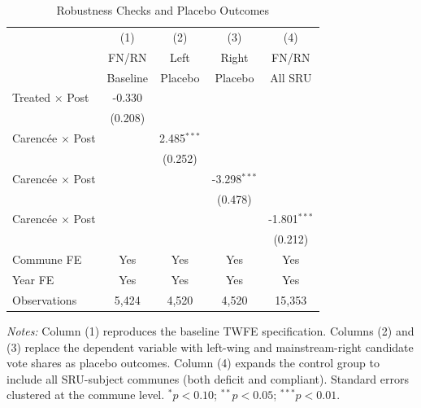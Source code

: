 \begin{table}[t]
\centering
\caption{Robustness Checks and Placebo Outcomes}
\label{tab:robustness}
\small
\begin{tabular}{lcccc}
\toprule
 & (1) & (2) & (3) & (4) \\
 & FN/RN & Left & Right & FN/RN \\
 & Baseline & Placebo & Placebo & All SRU \\
\midrule
Treated $\times$ Post & -0.330 & & & \\
 & (0.208) & & & \\
Carenc\'{e}e $\times$ Post & & 2.485$^{***}$ & & \\
 & & (0.252) & & \\
Carenc\'{e}e $\times$ Post & & & -3.298$^{***}$ & \\
 & & & (0.478) & \\
Carenc\'{e}e $\times$ Post & & & & -1.801$^{***}$ \\
 & & & & (0.212) \\
\midrule
Commune FE & Yes & Yes & Yes & Yes \\
Year FE & Yes & Yes & Yes & Yes \\
Observations & 5,424 & 4,520 & 4,520 & 15,353 \\
\bottomrule
\end{tabular}
\begin{tablenotes}
\item \textit{Notes:} Column (1) reproduces the baseline TWFE specification. Columns (2) and (3) replace the dependent variable with left-wing and mainstream-right candidate vote shares as placebo outcomes. Column (4) expands the control group to include all SRU-subject communes (both deficit and compliant). Standard errors clustered at the commune level. $^{*}p<0.10$; $^{**}p<0.05$; $^{***}p<0.01$.
\end{tablenotes}
\end{table}

